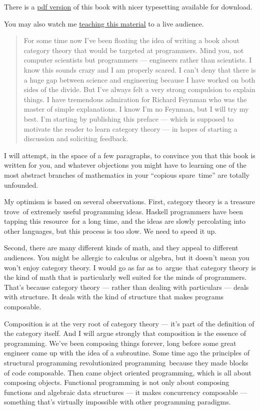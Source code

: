 There is a \href{https://github.com/hmemcpy/milewski-ctfp-pdf}{pdf
version} of this book with nicer typesetting available for download.

You may also watch me
\href{https://www.youtube.com/playlist?list=PLbgaMIhjbmEnaH_LTkxLI7FMa2HsnawM_}{teaching
this material} to a live audience.

\begin{quote}
For some time now I've been floating the idea of writing a book about
category theory that would be targeted at programmers. Mind you, not
computer scientists but programmers --- engineers rather than
scientists. I know this sounds crazy and I am properly scared. I can't
deny that there is a huge gap between science and engineering because I
have worked on both sides of the divide. But I've always felt a very
strong compulsion to explain things. I have tremendous admiration for
Richard Feynman who was the master of simple explanations. I know I'm no
Feynman, but I will try my best. I'm starting by publishing this preface
--- which is supposed to motivate the reader to learn category theory
--- in hopes of starting a discussion and soliciting feedback.
\end{quote}

I will attempt, in the space of a few paragraphs, to convince you that
this book is written for you, and whatever objections you might have to
learning one of the most abstract branches of mathematics in your
``copious spare~time'' are totally unfounded.

My optimism is based on several observations. First, category theory is
a treasure trove~of extremely useful programming ideas. Haskell
programmers have been tapping this resource~for a long time, and the
ideas are slowly percolating into other languages, but this process is
too slow. We need to speed it up.

Second, there are many different kinds of math, and they appeal to
different audiences. You might be allergic to calculus or algebra, but
it doesn't mean you won't enjoy category theory. I would go as far as
to~argue~that category theory is the kind of math that is particularly
well suited for the minds of programmers. That's because category theory
--- rather than dealing with particulars --- deals with structure. It
deals with the kind of structure that makes programs composable.

Composition is at the very root of category theory --- it's part of the
definition of the category itself. And I will argue strongly that
composition is the essence of programming. We've been composing things
forever, long before some great engineer came up with the idea of a
subroutine. Some time ago the principles of structural programming
revolutionized programming~because they made blocks of code composable.
Then came object oriented programming, which is all about composing
objects. Functional programming is not only about composing functions
and algebraic data structures --- it makes concurrency composable ---
something that's virtually impossible with other programming paradigms.


